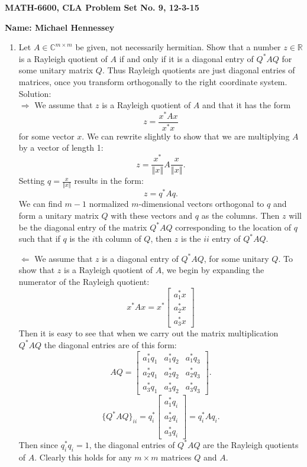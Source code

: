 \documentclass[12pt]{article}
\numberwithin{equation}{section}
\newcommand{\norm}[1]{\left\Vert#1\right\Vert}
\begin{document}
{\large\bf MATH-6600, CLA Problem Set No. 9, 12-3-15}



\vspace{6 ex}

{\bf Name: Michael Hennessey} \hfill

\vspace{6 ex}

\begin{enumerate}
    \item Let $A\in\mathbb{C}^{m\times m}$ be given, not necessarily hermitian. Show that a number $z\in\mathbb{R}$ is a Rayleigh quotient of $A$ if and only if it is a diagonal entry of $Q^*AQ$ for some unitary matrix $Q$. Thus Rayleigh quotients are just diagonal entries of matrices, once you transform orthogonally to the right coordinate system.\\

        Solution:\\

        $\Rightarrow$ We assume that $z$ is a Rayleigh quotient of $A$ and that it has the form
        $$z=\frac{x^*Ax}{x^*x}$$
        for some vector $x$. We can rewrite slightly to show that we are multiplying $A$ by a vector of length 1:
        $$z=\frac{x^*}{\norm{x}}A\frac{x}{\norm{x}}.$$
        Setting $q=\frac{x}{\norm{x}}$ results in the form:
        $$z=q^*Aq.$$
        We can find $m-1$ normalized $m$-dimensional vectors orthogonal to $q$ and form a unitary matrix $Q$ with these vectors and $q$ as the columns. Then $z$ will be the diagonal entry of the matrix $Q^*AQ$ corresponding to the location of $q$ such that if $q$ is the $i$th column of $Q$, then $z$ is the $ii$ entry of $Q^*AQ$.

        $\Leftarrow$ We assume that $z$ is a diagonal entry of $Q^*AQ$, for some unitary $Q$. To show that $z$ is a Rayleigh quotient of $A$, we begin by expanding the numerator of the Rayleigh quotient:
        $$x^*Ax=x^*\left[\begin{array}{c}a_1^*x\\a_2^*x\\a_3^*x\end{array}\right]$$
        Then it is easy to see that when we carry out the matrix multiplication $Q^*AQ$ the diagonal entries are of this form:
        $$AQ=\left[\begin{array}{ccc}a_1^*q_1&a_1^*q_2&a_1^*q_3\\a_2^*q_1&a_2^*q_2&a_2^*q_3\\a_3^*q_1&a_3^*q_2&a_3^*q_3\end{array}\right].$$
        $$\{Q^*AQ\}_{ii}=q^*_i\left[\begin{array}{c}a_1^*q_i\\a_2^*q_i\\a_3^*q_i\end{array}\right]=q_i^*Aq_i.$$
        Then since $q_i^*q_i=1$, the diagonal entries of $Q^*AQ$ are the Rayleigh quotients of $A$. Clearly this holds for any $m\times m$ matrices $Q$ and $A$.


\end{enumerate}
\end{document}
